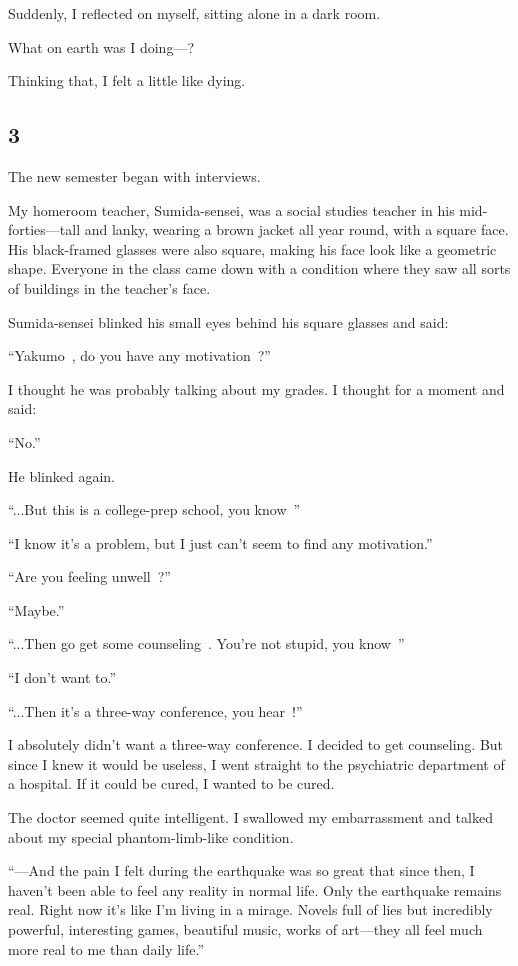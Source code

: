 \documentclass[
    a4paper,
    12pt,
    twoside,
    openany,
    UTF8,
    fontset=windows
]{ctexbook}
\begin{document}
Suddenly, I reflected on myself, sitting alone in a dark room.

What on earth was I doing---?

Thinking that, I felt a little like dying.


\subsection*{3}

The new semester began with interviews.

My homeroom teacher, Sumida-sensei, was a social studies teacher in his mid-forties---tall and lanky, wearing a brown jacket all year round, with a square face. His black-framed glasses were also square, making his face look like a geometric shape. Everyone in the class came down with a condition where they saw all sorts of buildings in the teacher's face.

Sumida-sensei blinked his small eyes behind his square glasses and said:

``Yakumo~, do you have any motivation~?''

I thought he was probably talking about my grades. I thought for a moment and said:

``No.''

He blinked again.

``...But this is a college-prep school, you know~''

``I know it's a problem, but I just can't seem to find any motivation.''

``Are you feeling unwell~?''

``Maybe.''

``...Then go get some counseling~. You're not stupid, you know~''

``I don't want to.''

``...Then it's a three-way conference, you hear~!''

I absolutely didn't want a three-way conference. I decided to get counseling. But since I knew it would be useless, I went straight to the psychiatric department of a hospital. If it could be cured, I wanted to be cured.

The doctor seemed quite intelligent. I swallowed my embarrassment and talked about my special phantom-limb-like condition.

``---And the pain I felt during the earthquake was so great that since then, I haven't been able to feel any reality in normal life. Only the earthquake remains real. Right now it's like I'm living in a mirage. Novels full of lies but incredibly powerful, interesting games, beautiful music, works of art---they all feel much more real to me than daily life.''
\end{document}
